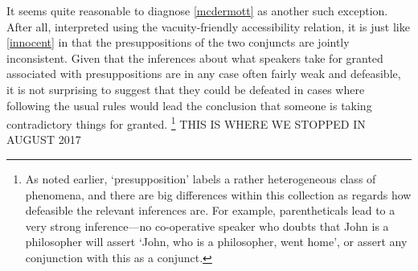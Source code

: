 \documentclass[If.tex]{subfiles}
\begin{document}
\begin{prop}
\begin{prop}
\end{prop}
It seems quite reasonable to diagnose \ref{mcdermott} as another such exception.  After all, interpreted using the vacuity-friendly accessibility relation, it is just like \ref{innocent} in that the presuppositions of the two conjuncts are jointly inconsistent.  Given that the inferences about what speakers take for granted associated with presuppositions are in any case often fairly weak and defeasible, it is not surprising to suggest that they could be defeated in cases where following the usual rules would lead the conclusion that someone is taking contradictory things for granted.%
\footnote{As noted earlier, ‘presupposition’ labels a rather heterogeneous class of phenomena, and there are big differences within this collection as regards how defeasible the relevant inferences are.  For example, parentheticals lead to a very strong inference---no co-operative speaker who doubts that John is a philosopher will assert ‘John, who is a philosopher, went home’, or assert any conjunction with this as a conjunct.}  
THIS IS WHERE WE STOPPED IN AUGUST 2017




\end{prop}
\end{document}

